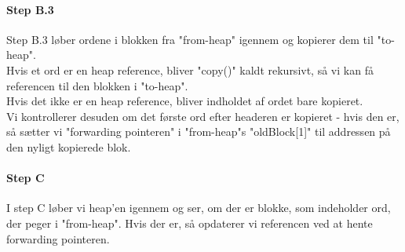 \paragraph{Step B.3}
Step B.3 løber ordene i blokken fra "from-heap" igennem og kopierer dem til "to-heap". 
\\Hvis et ord er en heap reference, bliver "copy()" kaldt rekursivt, så vi kan få referencen til den blokken i "to-heap".
\\Hvis det ikke er en heap reference, bliver indholdet af ordet bare kopieret.
\\ Vi kontrollerer desuden om det første ord efter headeren er kopieret - hvis den er, så sætter vi "forwarding pointeren" i "from-heap"s "oldBlock[1]" til addressen på den nyligt kopierede blok.
\paragraph{Step C}
I step C løber vi heap'en igennem og ser, om der er blokke, som indeholder ord, der peger i "from-heap". Hvis der er, så opdaterer vi referencen ved at hente forwarding pointeren.
